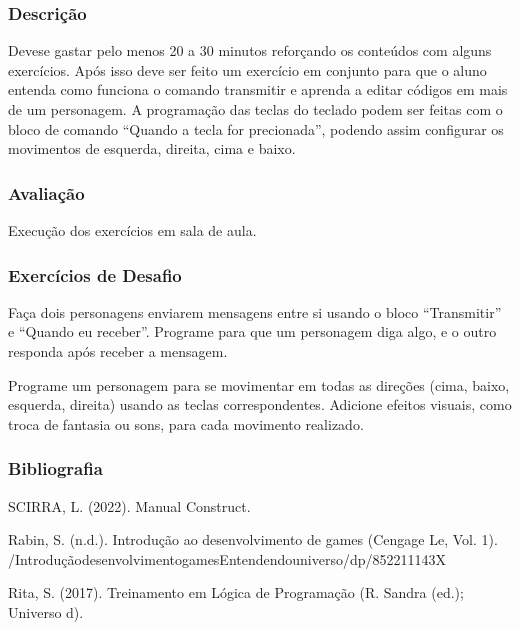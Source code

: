 \documentclass[letterpaper,10pt,brazil]{sphinxmanual}
\begin{document}
\subsubsection*{Descrição}

\sphinxAtStartPar
Deve\sphinxhyphen{}se gastar pelo menos 20 a 30 minutos reforçando os conteúdos com alguns
exercícios. Após isso deve ser feito um exercício em conjunto para que o aluno entenda
como funciona o comando transmitir e aprenda a editar códigos em mais de um
personagem.
A programação das teclas do teclado podem ser feitas com o bloco de comando “Quando a
tecla for precionada”, podendo assim configurar os movimentos de esquerda, direita, cima e
baixo.
\subsubsection*{Avaliação}

\sphinxAtStartPar
Execução dos exercícios em sala de aula.
\subsubsection*{Exercícios de Desafio}

\sphinxAtStartPar
{}
Faça dois personagens enviarem mensagens entre si usando o bloco “Transmitir” e “Quando eu receber”.
Programe para que um personagem diga algo, e o outro responda após receber a mensagem.

\sphinxAtStartPar
{}
Programe um personagem para se movimentar em todas as direções (cima, baixo, esquerda, direita) usando as teclas correspondentes.
Adicione efeitos visuais, como troca de fantasia ou sons, para cada movimento realizado.
\subsubsection*{Bibliografia}

\sphinxAtStartPar
SCIRRA, L. (2022). Manual Construct.

\sphinxAtStartPar
Rabin, S. (n.d.). Introdução ao desenvolvimento de games (Cengage Le, Vol. 1).
/Introdução\sphinxhyphen{}desenvolvimento\sphinxhyphen{}games\sphinxhyphen{}Entendendo\sphinxhyphen{}universo/dp/852211143X

\sphinxAtStartPar
Rita, S. (2017). Treinamento em Lógica de Programação (R. Sandra (ed.); Universo d).
\end{document}
